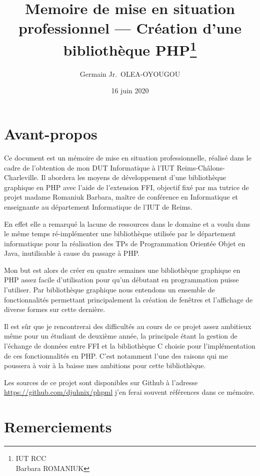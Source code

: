 \documentclass[11pt,a4paper,krantz2,11pt,oneside]{krantz}
\title{Memoire de mise en situation professionnel --- Création d'une bibliothèque PHP\thanks{IUT RCC\\
Barbara ROMANIUK}}
\author{Germain Jr.~OLEA-OYOUGOU}
\date{16 juin 2020}
\begin{document}
\maketitle

{
\hypersetup{linkcolor=}
\setcounter{tocdepth}{1}
\tableofcontents
}
\listoftables
\listoffigures
\hypertarget{avant-propos}{%
\chapter*{Avant-propos}\label{avant-propos}}


Ce document est un mémoire de mise en situation professionnelle, réalisé dans le cadre de l'obtention de mon DUT Informatique à l'IUT Reims-Châlons-Charleville. Il abordera les moyens de développement d'une bibliothèque graphique en PHP avec l'aide de l'extension FFI, objectif fixé par ma tutrice de projet madame Romaniuk Barbara, maître de conférence en Informatique et enseignante au département Informatique de l'IUT de Reims.

En effet elle a remarqué la lacune de ressources dans le domaine et a voulu dans le même temps ré-implémenter une bibliothèque utilisée par le département informatique pour la réalisation des TPs de Programmation Orientée Objet en Java, inutilisable à cause du passage à PHP.

Mon but est alors de créer en quatre semaines une bibliothèque graphique en PHP assez facile d'utilisation pour qu'un débutant en programmation puisse l'utiliser. Par bibliothèque graphique nous entendons un ensemble de fonctionnalités permettant principalement la création de fenêtres et l'affichage de diverse formes sur cette dernière.

Il est sûr que je rencontrerai des difficultés au cours de ce projet assez ambitieux même pour un étudiant de deuxième année, la principale étant la gestion de l'échange de données entre FFI et la bibliothèque C choisie pour l'implémentation de ces fonctionnalités en PHP. C'est notamment l'une des raisons qui me poussera à voir à la baisse mes ambitions pour cette bibliothèque.

Les sources de ce projet sont disponibles sur Github à l'adresse \url{https://github.com/djuhnix/phpml} j'en ferai souvent références dans ce mémoire.

\mainmatter

\hypertarget{remerciements}{%
\chapter*{Remerciements}\label{remerciements}}
\end{document}
